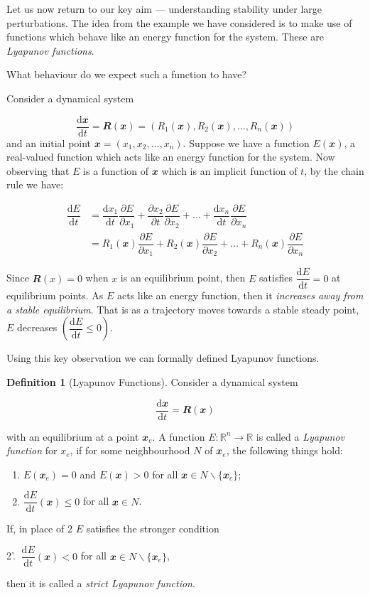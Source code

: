\documentclass[
  a4paper,
  oneside,
  final]{krantz}
\providecommand{\tightlist}{%
  \setlength{\itemsep}{0pt}\setlength{\parskip}{0pt}}
\newcommand{\R}{\mathbb{R}}
\renewcommand{\d}{\mathrm{d}}
\renewcommand{\v}[1]{{\mathbfit{#1}}}
\newcommand{\pder}[2]{\dfrac{\partial #1}{\partial#2}}
\newcommand{\der}[2]{\dfrac{\d #1}{\d #2}}
\theoremstyle{definition}
\newtheorem{definition}{Definition}[chapter]
\theoremstyle{definition}
\theoremstyle{definition}
\theoremstyle{definition}
\theoremstyle{remark}
\begin{document}
Let us now return to our key aim --- understanding stability under large perturbations. The idea from the example we have considered is to make use of functions which behave like an energy function for the system. These are \emph{Lyapunov functions}.

What behaviour do we expect such a function to have?

Consider a dynamical system

\[ \der{\v{x}}{t} = \v{R}(\v{x}) = (R_1(\v{x}), R_2(\v{x}), \ldots, R_{n}(\v{x}))\]
and an initial point \(\v{x} = (x_1, x_2, \ldots, x_n)\). Suppose we have a function \(E(\v{x})\), a real-valued function which acts like an energy function for the system. Now observing that \(E\) is a function of \(\v{x}\) which is an implicit function of \(t\), by the chain rule we have:

\begin{align*}
\der{E}{t}  &= \der{x_1}{t} \pder{E}{x_1} + \pder{x_2}{t} \pder{E}{x_2} + \ldots + \der{x_n}{t} \pder{E}{x_n} \\ 
&= R_1(\v{x}) \pder{E}{x_1} + R_2(\v{x}) \pder{E}{x_2} + \ldots + R_n(\v{x}) \pder{E}{x_n}  
\end{align*}

Since \(\v{R}(x) = 0\) when \(x\) is an equilibrium point, then \(E\) satisfies \(\der{E}{t} = 0\) at equilibrium points. As \(E\) acts like an energy function, then it \emph{increases away from a stable equilibrium}. That is as a trajectory moves towards a stable steady point, \(E\) decreases \(\left(\der{E}{t} \le 0\right)\).

Using this key observation we can formally defined Lyapunov functions.

\begin{definition}[Lyapunov Functions]
\protect\hypertarget{def:Luapunov-function-def}{}\label{def:Luapunov-function-def}Consider a dynamical system

\[ \der{\v{x}}{t} = \v{R}(\v{x})\]

with an equilibrium at a point \(\v{x}_{e}\). A function \(E: \R^{n} \to \R\) is called a \emph{Lyapunov function} for \(x_{e}\), if for some neighbourhood \(N\) of \(\v{x}_{e}\), the following things hold:

\begin{enumerate}
\def\labelenumi{\arabic{enumi})}
\tightlist
\item
  \(E(\v{x}_{e}) = 0\) and \(E(\v{x}) >0\) for all \(\v{x} \in N \backslash \{\v{x}_{e}\}\);
\item
  \(\der{E}{t}(\v{x}) \le 0\) for all \(\v{x} \in N\).
\end{enumerate}

If, in place of \(2\) \(E\) satisfies the stronger condition

\begin{center}
2'. \(\ \der{E}{t} (\v{x}) < 0\) for all \(\v{x} \in N \backslash \{\v{x}_{e}\}\),

\end{center}

then it is called a \emph{strict Lyapunov function}.
\end{definition}
\end{document}
